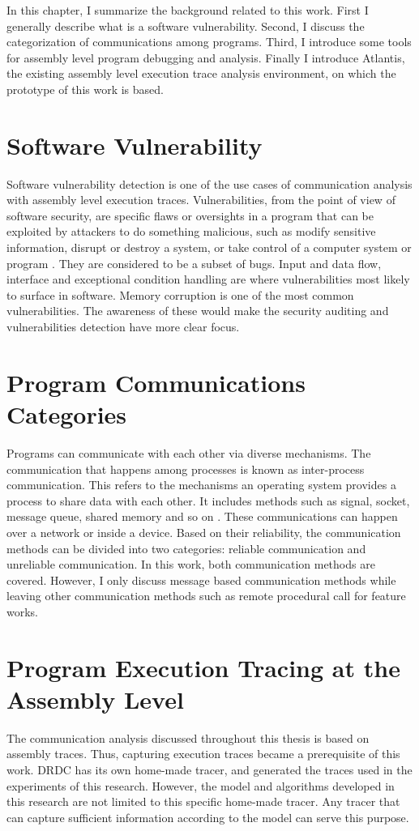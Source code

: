 \label{chapter:Bac}
In this chapter, I summarize the background related to this work. First I generally describe what is a software vulnerability. Second, I discuss the categorization of communications among programs. Third, I introduce some tools for assembly level program debugging and analysis. Finally I introduce Atlantis, the existing assembly level execution trace analysis environment, on which the prototype of this work is based.

\section{Software Vulnerability}
Software vulnerability detection is one of the use cases of communication analysis with assembly level execution traces. Vulnerabilities, from the point of view of software security, are specific flaws or oversights in a program that can be exploited by attackers to do something malicious, such as modify sensitive information, disrupt or destroy a system, or take control of a computer system or program \cite{dowd_art_2006}. They are considered to be a subset of bugs. Input and data flow, interface and exceptional condition handling are where vulnerabilities most likely to surface in software. Memory corruption is one of the most common vulnerabilities. The awareness of these would make the security auditing and vulnerabilities detection have more clear focus. 

\section{Program Communications Categories}
Programs can communicate with each other via diverse mechanisms. The communication that happens among processes is known as inter-process communication. This refers to the mechanisms an operating system provides a process to share data with each other. It includes methods such as signal, socket, message queue, shared memory and so on \cite{garrido2000inter}. These communications can happen over a network or inside a device. Based on their reliability, the communication methods can be divided into two categories: reliable communication and unreliable communication. In this work, both communication methods are covered. However, I only discuss message based communication methods while leaving other communication methods such as remote procedural call for feature works.

\section{Program Execution Tracing at the Assembly Level}
The communication analysis discussed throughout this thesis is based on assembly traces. Thus, capturing execution traces became a prerequisite of this work. DRDC has its own home-made tracer, and generated the traces used in the experiments of this research. However, the model and algorithms developed in this research are not limited to this specific home-made tracer. Any tracer that can capture sufficient information according to the model can serve this purpose.


